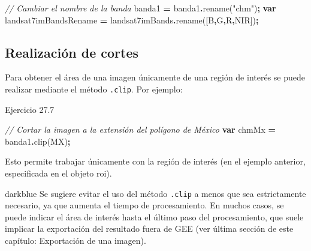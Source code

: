 \documentclass[
  12pt,
  letterpaper,
  twoside]{book}
\newenvironment{Shaded}{\begin{snugshade}}{\end{snugshade}}
\newcommand{\CommentTok}[1]{\textcolor[rgb]{0.56,0.35,0.01}{\textit{#1}}}
\newcommand{\FunctionTok}[1]{\textcolor[rgb]{0.00,0.00,0.00}{#1}}
\newcommand{\KeywordTok}[1]{\textcolor[rgb]{0.13,0.29,0.53}{\textbf{#1}}}
\newcommand{\NormalTok}[1]{#1}
\newcommand{\OperatorTok}[1]{\textcolor[rgb]{0.81,0.36,0.00}{\textbf{#1}}}
\newcommand{\StringTok}[1]{\textcolor[rgb]{0.31,0.60,0.02}{#1}}
\begin{document}
\begin{Shaded}
\begin{Highlighting}[]
\CommentTok{// Cambiar el nombre de la banda }
\NormalTok{banda1 }\OperatorTok{=}\NormalTok{ banda1}\OperatorTok{.}\FunctionTok{rename}\NormalTok{(}\StringTok{"chm"}\NormalTok{)}\OperatorTok{;}
\KeywordTok{var}\NormalTok{ landsat7imBandsRename }\OperatorTok{=}\NormalTok{ landsat7imBands}\OperatorTok{.}\FunctionTok{rename}\NormalTok{([}\StringTok{\textquotesingle{}B\textquotesingle{}}\OperatorTok{,}\StringTok{\textquotesingle{}G\textquotesingle{}}\OperatorTok{,}\StringTok{\textquotesingle{}R\textquotesingle{}}\OperatorTok{,}\StringTok{\textquotesingle{}NIR\textquotesingle{}}\NormalTok{])}\OperatorTok{;}
\end{Highlighting}
\end{Shaded}

\hypertarget{realizaciuxf3n-de-cortes}{%
\subsection{Realización de cortes}\label{realizaciuxf3n-de-cortes}}

Para obtener el área de una imagen únicamente de una región de interés se puede realizar mediante el método \texttt{.clip}. Por ejemplo:

Ejercicio 27.7

\begin{Shaded}
\begin{Highlighting}[]
\CommentTok{// Cortar la imagen a la extensión del polígono de México}
\KeywordTok{var}\NormalTok{ chmMx }\OperatorTok{=}\NormalTok{ banda1}\OperatorTok{.}\FunctionTok{clip}\NormalTok{(MX)}\OperatorTok{;}
\end{Highlighting}
\end{Shaded}

Esto permite trabajar únicamente con la región de interés (en el ejemplo anterior, especificada en el objeto roi).

\begin{bluebox2}

\begin{awesomeblock}{5pt}{\faLightbulb}{darkblue}
Se sugiere evitar el uso del método \texttt{.clip} a menos que sea estrictamente necesario, ya que aumenta el tiempo de procesamiento. En muchos casos, se puede indicar el área de interés hasta el último paso del procesamiento, que suele implicar la exportación del resultado fuera de GEE (ver última sección de este capítulo: Exportación de una imagen).

\end{awesomeblock}

\end{bluebox2}
\end{document}
